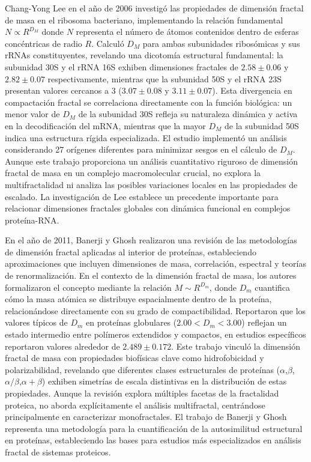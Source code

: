 Chang-Yong Lee en el año de 2006\cite{Lee2006} investigó las propiedades de dimensión fractal de masa en el ribosoma bacteriano, implementando la relación fundamental $N \propto R^{D_M}$ donde $N$ representa el número de átomos contenidos dentro de esferas concéntricas de radio $R$. Calculó $D_M$ para ambas subunidades ribosómicas y sus rRNAs constituyentes, revelando una dicotomía estructural fundamental: la subunidad 30S y el rRNA 16S exhiben dimensiones fractales de $2.58 \pm 0.06$ y $2.82 \pm 0.07$ respectivamente, mientras que la subunidad 50S y el rRNA 23S presentan valores cercanos a 3 ($3.07 \pm 0.08$ y $3.11 \pm 0.07$). Esta divergencia en compactación fractal se correlaciona directamente con la función biológica: un menor valor de $D_M$ de la subunidad 30S refleja su naturaleza dinámica y activa en la decodificación del mRNA, mientras que la mayor $D_M$ de la subunidad 50S indica una estructura rígida especializada. El estudio implementó un análisis considerando 27 orígenes diferentes para minimizar sesgos en el cálculo de $D_M$. Aunque este trabajo proporciona un análisis cuantitativo riguroso de dimensión fractal de masa en un complejo macromolecular crucial, no explora la multifractalidad ni analiza las posibles variaciones locales en las propiedades de escalado. La investigación de Lee establece un precedente importante para relacionar dimensiones fractales globales con dinámica funcional en complejos proteína-RNA.
	
En el año de 2011, Banerji y Ghosh \cite{Banerji2011} realizaron una revisión de las metodologías de dimensión fractal aplicadas al interior de proteínas, estableciendo aproximaciones que incluyen dimensiones de masa, correlación, espectral y teorías de renormalización. En el contexto de la dimensión fractal de masa, los autores formalizaron el concepto mediante la relación $M \sim R^{D_m}$, donde $D_m$ cuantifica cómo la masa atómica se distribuye espacialmente dentro de la proteína, relacionándose directamente con su grado de compactibilidad. Reportaron que los valores típicos de $D_m$ en proteínas globulares ($2.00 < D_m < 3.00$) reflejan un estado intermedio entre polímeros extendidos y compactos, en estudios específicos reportaron valores alrededor de $2.489 \pm 0.172$. Este trabajo vinculó la dimensión fractal de masa con propiedades biofísicas clave como hidrofobicidad y polarizabilidad, revelando que diferentes clases estructurales de proteínas ($\alpha$,$\beta$,$\alpha/\beta$,$\alpha+\beta$) exhiben simetrías de escala distintivas en la distribución de estas propiedades. Aunque la revisión explora múltiples facetas de la fractalidad proteica, no aborda explícitamente el análisis multifractal, centrándose principalmente en caracterizar monofractales. El trabajo de Banerji y Ghosh representa una metodología para la cuantificación de la autosimilitud estructural en proteínas, estableciendo las bases para estudios más especializados en análisis fractal de sistemas proteicos.


